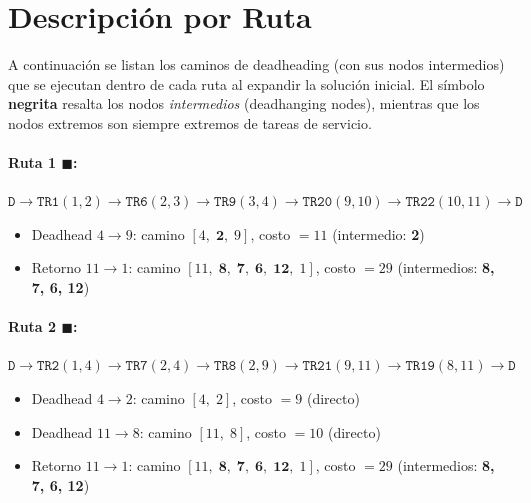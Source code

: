 \documentclass[12pt, a4paper]{article}
\begin{document}
\section{Descripción por Ruta}

A continuación se listan los caminos de deadheading (con sus nodos
intermedios) que se ejecutan dentro de cada ruta al expandir la
solución inicial. El símbolo \textbf{negrita} resalta los nodos
\emph{intermedios} (deadhanging nodes), mientras que los nodos
extremos son siempre extremos de tareas de servicio.

\paragraph{Ruta 1 \textcolor{routeA}{$\blacksquare$}\;:}
$\texttt{D} \to \texttt{TR1}(1,2) \to \texttt{TR6}(2,3) \to
        \texttt{TR9}(3,4) \to \texttt{TR20}(9,10) \to
        \texttt{TR22}(10,11) \to \texttt{D}$
\begin{itemize}
  \item Deadhead $4 \to 9$: camino $[4,\;\mathbf{2},\;9]$, costo $= 11$
        \quad(intermedio: \textbf{2})
  \item Retorno $11 \to 1$: camino
        $[11,\;\mathbf{8},\;\mathbf{7},\;\mathbf{6},\;\mathbf{12},\;1]$,
        costo $= 29$ \quad(intermedios: \textbf{8, 7, 6, 12})
\end{itemize}

\paragraph{Ruta 2 \textcolor{routeB}{$\blacksquare$}\;:}
$\texttt{D} \to \texttt{TR2}(1,4) \to \texttt{TR7}(2,4) \to
        \texttt{TR8}(2,9) \to \texttt{TR21}(9,11) \to
        \texttt{TR19}(8,11) \to \texttt{D}$
\begin{itemize}
  \item Deadhead $4 \to 2$: camino $[4,\;2]$, costo $= 9$ (directo)
  \item Deadhead $11 \to 8$: camino $[11,\;8]$, costo $= 10$ (directo)
  \item Retorno $11 \to 1$: camino
        $[11,\;\mathbf{8},\;\mathbf{7},\;\mathbf{6},\;\mathbf{12},\;1]$,
        costo $= 29$ \quad(intermedios: \textbf{8, 7, 6, 12})
\end{itemize}
\end{document}

